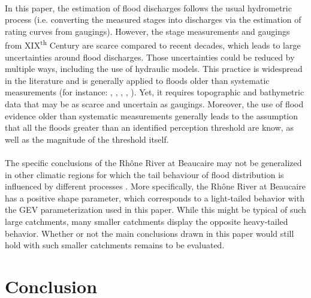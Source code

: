 \documentclass[11pt]{article}
\begin{document}
    \paragraph{}
    In this paper, the estimation of flood discharges follows the usual hydrometric process (i.e. converting the measured stages into discharges via the estimation of rating curves from gaugings). However, the stage measurements and gaugings from XIX\textsuperscript{th} Century are scarce compared to recent decades, which leads to large uncertainties around flood discharges. Those uncertainties could be reduced by multiple ways, including the use of hydraulic models. This practice is widespread in the literature and is generally applied to floods older than systematic measurements (for instance: \citet{naulet_flood_2005}, \citet{neppel_flood_2010}, \citet{machado_flood_2015}, \citet{ruiz-bellet_uncertainty_2017}, \citet{van_der_meulen_late_2021}). Yet, it requires topographic and bathymetric data that may be as scarce and uncertain as gaugings. Moreover, the use of flood evidence older than systematic measurements generally leads to the assumption that all the floods greater than an identified perception threshold are know, as well as the magnitude of the threshold itself.
    
    \paragraph{}
    The specific conclusions of the Rhône River at Beaucaire may not be generalized in other climatic regions for which the tail behaviour of flood distribution is influenced by different processes \citep{merz_understanding_2022}. More specifically, the Rhône River at Beaucaire has a positive shape parameter, which corresponds to a light-tailed behavior with the GEV parameterization used in this paper. While this might be typical of such large catchments, many smaller catchments display the opposite heavy-tailed behavior. Whether or not the main conclusions drawn in this paper would still hold with such smaller catchments remains to be evaluated.
    \paragraph{}
    

 

\section{Conclusion}
\label{sec:Conclusion}
\end{document}

